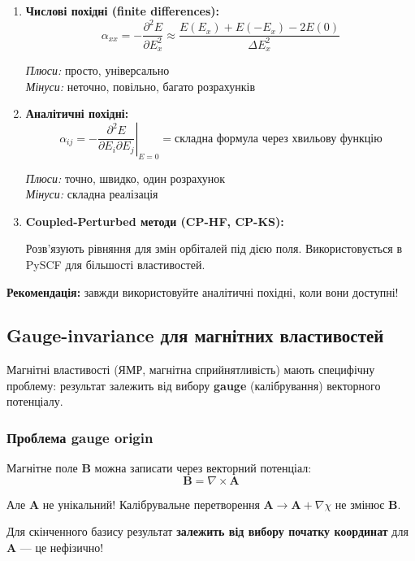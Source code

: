 \begin{enumerate}
    \item \textbf{Числові похідні (finite differences):}
    \[
    \alpha_{xx} = -\frac{\partial^2 E}{\partial E_x^2} \approx
    \frac{E(E_x) + E(-E_x) - 2E(0)}{\Delta E_x^2}
    \]

    \textit{Плюси:} просто, універсально\\
    \textit{Мінуси:} неточно, повільно, багато розрахунків

    \item \textbf{Аналітичні похідні:}
    \[
    \alpha_{ij} = -\left.\frac{\partial^2 E}{\partial E_i \partial E_j}\right|_{E=0}
    = \text{складна формула через хвильову функцію}
    \]

    \textit{Плюси:} точно, швидко, один розрахунок\\
    \textit{Мінуси:} складна реалізація

    \item \textbf{Coupled-Perturbed методи (CP-HF, CP-KS):}

    Розв'язують рівняння для змін орбіталей під дією поля.
    Використовується в PySCF для більшості властивостей.
\end{enumerate}

\textbf{Рекомендація:} завжди використовуйте аналітичні похідні, коли вони доступні!

\subsection*{Gauge-invariance для магнітних властивостей}

Магнітні властивості (ЯМР, магнітна сприйнятливість) мають специфічну проблему:
результат залежить від вибору \textbf{gauge} (калібрування) векторного потенціалу.

\subsubsection*{Проблема gauge origin}

Магнітне поле $\mathbf{B}$ можна записати через векторний потенціал:
\[
\mathbf{B} = \nabla \times \mathbf{A}
\]

Але $\mathbf{A}$ не унікальний! Калібрувальне перетворення
$\mathbf{A} \to \mathbf{A} + \nabla\chi$ не змінює $\mathbf{B}$.

Для скінченного базису результат \textbf{залежить від вибору початку координат}
для $\mathbf{A}$ --- це нефізично!

